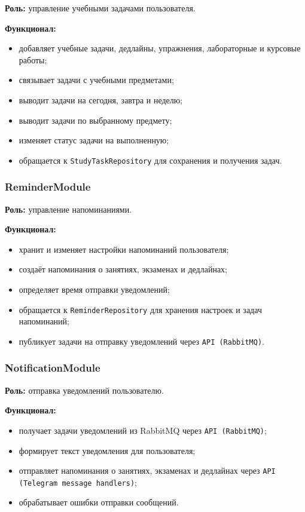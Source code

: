 \documentclass[10pt,a4paper,final]{article} %
\begin{document}
\textbf{Роль:} управление учебными задачами пользователя.

\textbf{Функционал:}
\begin{itemize}
    \item добавляет учебные задачи, дедлайны, упражнения, лабораторные и
    курсовые работы;
    \item связывает задачи с учебными предметами;
    \item выводит задачи на сегодня, завтра и неделю;
    \item выводит задачи по выбранному предмету;
    \item изменяет статус задачи на выполненную;
    \item обращается к \texttt{StudyTaskRepository} для сохранения и получения
    задач.
\end{itemize}

\subsubsection{ReminderModule}

\textbf{Роль:} управление напоминаниями.

\textbf{Функционал:}
\begin{itemize}
    \item хранит и изменяет настройки напоминаний пользователя;
    \item создаёт напоминания о занятиях, экзаменах и дедлайнах;
    \item определяет время отправки уведомлений;
    \item обращается к \texttt{ReminderRepository} для хранения настроек и
    задач напоминаний;
    \item публикует задачи на отправку уведомлений через
    \texttt{API (RabbitMQ)}.
\end{itemize}

\subsubsection{NotificationModule}

\textbf{Роль:} отправка уведомлений пользователю.

\textbf{Функционал:}
\begin{itemize}
    \item получает задачи уведомлений из RabbitMQ через \texttt{API (RabbitMQ)};
    \item формирует текст уведомления для пользователя;
    \item отправляет напоминания о занятиях, экзаменах и дедлайнах через
    \texttt{API (Telegram message handlers)};
    \item обрабатывает ошибки отправки сообщений.
\end{itemize}
\end{document}
